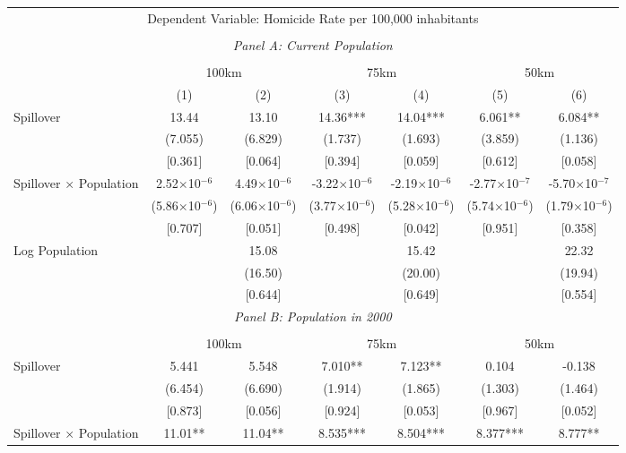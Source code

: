 \documentclass{article}
\begin{document}
\begin{table}[htbp]
\begin{tabular}{lcccccc}
\midrule
\multicolumn{7}{c}{Dependent Variable: Homicide Rate per 100,000 inhabitants} \\\\
\midrule
\multicolumn{7}{c}{\textit{Panel A: Current Population}} \\
\cmidrule{2-7} \\
& \multicolumn{2}{c}{100km} & \multicolumn{2}{c}{75km} & \multicolumn{2}{c}{50km} \\
\cmidrule(lr){2-3} \cmidrule(lr){4-5} \cmidrule(lr){6-7}
& (1) & (2) & (3) & (4) & (5) & (6) \\
\midrule
Spillover & 13.44 & 13.10 & 14.36*** & 14.04*** & 6.061** & 6.084** \\
& (7.055) & (6.829) & (1.737) & (1.693) & (3.859) & (1.136) \\
& [0.361] & [0.064] & [0.394] & [0.059] & [0.612] & [0.058] \\[0.5em]
Spillover × Population & 2.52$\times$10$^{-6}$ & 4.49$\times$10$^{-6}$ & -3.22$\times$10$^{-6}$ & -2.19$\times$10$^{-6}$ & -2.77$\times$10$^{-7}$ & -5.70$\times$10$^{-7}$ \\
& (5.86$\times$10$^{-6}$) & (6.06$\times$10$^{-6}$) & (3.77$\times$10$^{-6}$) & (5.28$\times$10$^{-6}$) & (5.74$\times$10$^{-6}$) & (1.79$\times$10$^{-6}$) \\
& [0.707] & [0.051] & [0.498] & [0.042] & [0.951] & [0.358] \\[0.5em]
Log Population & & 15.08 & & 15.42 & & 22.32 \\
& & (16.50) & & (20.00) & & (19.94) \\
& & [0.644] & & [0.649] & & [0.554] \\[0.5em]
\midrule
\multicolumn{7}{c}{\textit{Panel B: Population in 2000}} \\[0.5em]
\cmidrule{2-7} \\
& \multicolumn{2}{c}{100km} & \multicolumn{2}{c}{75km} & \multicolumn{2}{c}{50km} \\
\cmidrule(lr){2-3} \cmidrule(lr){4-5} \cmidrule(lr){6-7}
Spillover & 5.441 & 5.548 & 7.010** & 7.123** & 0.104 & -0.138 \\
& (6.454) & (6.690) & (1.914) & (1.865) & (1.303) & (1.464) \\
& [0.873] & [0.056] & [0.924] & [0.053] & [0.967] & [0.052] \\[0.5em]
Spillover × Population & 11.01** & 11.04** & 8.535*** & 8.504*** & 8.377*** & 8.777** \\

\end{tabular}
\end{table}
\end{document}
